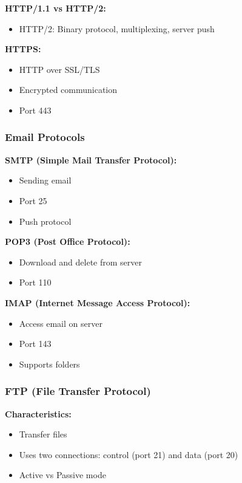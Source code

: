 \documentclass[11pt,a4paper]{article}
\begin{document}
\textbf{HTTP/1.1 vs HTTP/2:}
\begin{itemize}
    \item HTTP/2: Binary protocol, multiplexing, server push
\end{itemize}

\textbf{HTTPS:}
\begin{itemize}
    \item HTTP over SSL/TLS
    \item Encrypted communication
    \item Port 443
\end{itemize}

\subsubsection{Email Protocols}

\textbf{SMTP (Simple Mail Transfer Protocol):}
\begin{itemize}
    \item Sending email
    \item Port 25
    \item Push protocol
\end{itemize}

\textbf{POP3 (Post Office Protocol):}
\begin{itemize}
    \item Download and delete from server
    \item Port 110
\end{itemize}

\textbf{IMAP (Internet Message Access Protocol):}
\begin{itemize}
    \item Access email on server
    \item Port 143
    \item Supports folders
\end{itemize}

\subsubsection{FTP (File Transfer Protocol)}

\textbf{Characteristics:}
\begin{itemize}
    \item Transfer files
    \item Uses two connections: control (port 21) and data (port 20)
    \item Active vs Passive mode
\end{itemize}
\end{document}
